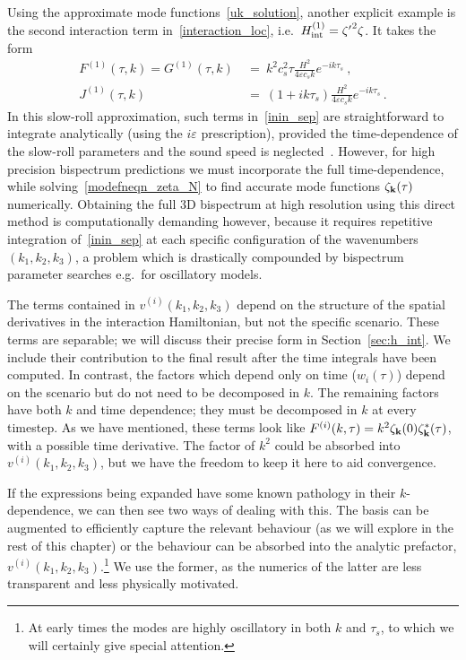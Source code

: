 Using the approximate mode functions~\eqref{uk_solution}, another explicit
example is the second interaction term in~\eqref{interaction_loc},
i.e.\ $H_{\rm int}^{(1)} = {\zeta'}^2\zeta$. It takes the form
\begin{align}\label{inin_example_FG}
    F^{(1)}(\tau,k) = G^{(1)}(\tau,k)  ~&=~  k^2 c^2_s \tau\frac{H^2}{4\varepsilon c_s k} e^{-ik\tau_s}~,\\
    J^{(1)}(\tau,k) ~&=~ (1+ik\tau_s)\frac{H^2}{4\varepsilon c_s k}e^{-ik\tau_s} \,.
\end{align}
In this slow-roll approximation, such terms in~\eqref{inin_sep} are straightforward
to integrate analytically (using the $i\varepsilon$ prescription), provided the time-dependence of
the slow-roll parameters and the sound speed is neglected~\cite{Maldacena}.
However, for high precision bispectrum predictions we must incorporate the full time-dependence,
while solving~\eqref{modefneqn_zeta_N} to find accurate mode functions $\zeta_{\bf k}(\tau)$ numerically.
Obtaining the full 3D bispectrum at high resolution using this direct method is computationally demanding however, because
it requires repetitive integration of~\eqref{inin_sep} at each specific configuration of the wavenumbers $(k_1, k_2, k_3)$,
a problem which is drastically compounded by bispectrum parameter searches e.g.\ for oscillatory models. 


The terms contained in $v^{(i)}(k_1, k_2,k_3)$ depend on the structure of the spatial derivatives in the interaction Hamiltonian,
but not the specific scenario. These terms are separable;
we will discuss their precise form in Section~\ref{sec:h_int}.
We include their contribution to the final result after the time integrals have been computed.
In contrast,
the factors which depend only on time ($w_i(\tau)$) depend on the scenario
but do not need to be decomposed in $k$.
The remaining factors have both $k$ and time dependence;
they must be decomposed in $k$ at every timestep.
As we have mentioned, these terms look like $F^{(i)}(k, \tau) = k^{2} \zeta_{\bf k}(0)\zeta_{\bf k}^*(\tau)$,
with a possible time derivative.
The factor of $k^2$ could be absorbed into $v^{(i)}(k_1, k_2,k_3)$, but we have the freedom to keep it here to aid convergence.

If the expressions being expanded have some known pathology in their $k$-dependence,
we can then see two ways of dealing with this.
The basis can be augmented to efficiently capture the relevant behaviour
(as we will explore in the rest of this chapter)
or the behaviour can be absorbed into the analytic prefactor, $v^{(i)}(k_1, k_2,k_3)$.\footnote{At early times the modes are highly oscillatory in both $k$ and $\tau_s$, to which we will certainly give special attention.}
We use the former, as the numerics of the latter are less transparent
and less physically motivated.

